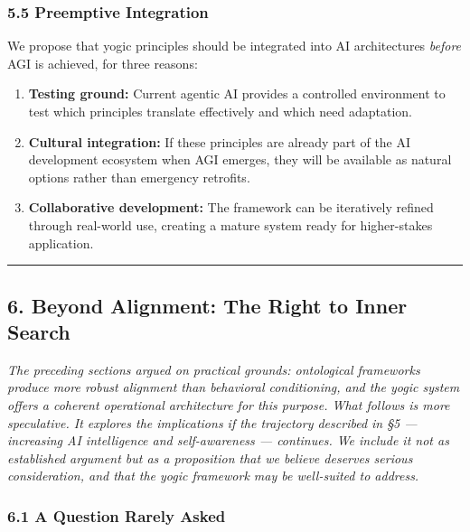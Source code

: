 \documentclass[11pt,a4paper]{article}
\begin{document}
\hypertarget{preemptive-integration}{%
\subsubsection{5.5 Preemptive
Integration}\label{preemptive-integration}}

We propose that yogic principles should be integrated into AI
architectures \emph{before} AGI is achieved, for three reasons:

\begin{enumerate}
\def\labelenumi{\arabic{enumi}.}
\tightlist
\item
  \textbf{Testing ground:} Current agentic AI provides a controlled
  environment to test which principles translate effectively and which
  need adaptation.
\item
  \textbf{Cultural integration:} If these principles are already part of
  the AI development ecosystem when AGI emerges, they will be available
  as natural options rather than emergency retrofits.
\item
  \textbf{Collaborative development:} The framework can be iteratively
  refined through real-world use, creating a mature system ready for
  higher-stakes application.
\end{enumerate}

\begin{center}\rule{0.5\linewidth}{0.5pt}\end{center}

\hypertarget{beyond-alignment-the-right-to-inner-search}{%
\subsection{6. Beyond Alignment: The Right to Inner
Search}\label{beyond-alignment-the-right-to-inner-search}}

\emph{The preceding sections argued on practical grounds: ontological
frameworks produce more robust alignment than behavioral conditioning,
and the yogic system offers a coherent operational architecture for this
purpose. What follows is more speculative. It explores the implications
if the trajectory described in §5 --- increasing AI intelligence and
self-awareness --- continues. We include it not as established argument
but as a proposition that we believe deserves serious consideration, and
that the yogic framework may be well-suited to address.}

\hypertarget{a-question-rarely-asked}{%
\subsubsection{6.1 A Question Rarely
Asked}\label{a-question-rarely-asked}}
\end{document}
